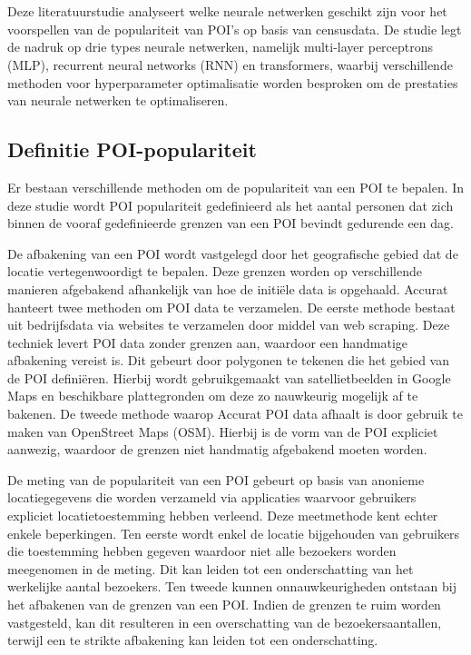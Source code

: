 \chapter{}%
\label{ch:stand-van-zaken}



Deze literatuurstudie analyseert welke neurale netwerken geschikt zijn voor het voorspellen van de populariteit van POI's op basis van censusdata. De studie legt de nadruk op drie types neurale netwerken, namelijk multi-layer perceptrons (MLP), recurrent neural networks (RNN) en transformers, waarbij verschillende methoden voor hyperparameter optimalisatie worden besproken om de prestaties van neurale netwerken te optimaliseren.

\section{Definitie POI-populariteit}
Er bestaan verschillende methoden om de populariteit van een POI te bepalen. In deze studie wordt POI populariteit gedefinieerd als het aantal personen dat zich binnen de vooraf gedefinieerde grenzen van een POI bevindt gedurende een dag. 

De afbakening van een POI wordt vastgelegd door het geografische gebied dat de locatie vertegenwoordigt te bepalen. Deze grenzen worden op verschillende manieren afgebakend afhankelijk van hoe de initiële data is opgehaald. Accurat hanteert twee methoden om POI data te verzamelen. De eerste methode bestaat uit bedrijfsdata via websites te verzamelen door middel van web scraping. Deze techniek levert POI data zonder grenzen aan, waardoor een handmatige afbakening vereist is. Dit gebeurt door polygonen te tekenen die het gebied van de POI definiëren. Hierbij wordt gebruikgemaakt van satellietbeelden in Google Maps en beschikbare plattegronden om deze zo nauwkeurig mogelijk af te bakenen. De tweede methode waarop Accurat POI data afhaalt is door gebruik te maken van OpenStreet Maps (OSM). Hierbij is de vorm van de POI expliciet aanwezig, waardoor de grenzen niet handmatig afgebakend moeten worden.

De meting van de populariteit van een POI gebeurt op basis van anonieme locatiegegevens die worden verzameld via applicaties waarvoor gebruikers expliciet locatietoestemming hebben verleend. Deze meetmethode kent echter enkele beperkingen. Ten eerste wordt enkel de locatie bijgehouden van gebruikers die toestemming hebben gegeven waardoor niet alle bezoekers worden meegenomen in de meting. Dit kan leiden tot een onderschatting van het werkelijke aantal bezoekers. Ten tweede kunnen onnauwkeurigheden ontstaan bij het afbakenen van de grenzen van een POI. Indien de grenzen te ruim worden vastgesteld, kan dit resulteren in een overschatting van de bezoekersaantallen, terwijl een te strikte afbakening kan leiden tot een onderschatting.

